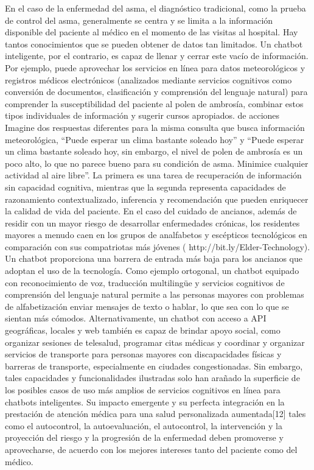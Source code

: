 En el caso de la enfermedad del asma, el diagnóstico tradicional, como la prueba de control del asma, generalmente se centra y se limita a la información disponible del paciente al médico en el momento de las visitas al hospital. Hay tantos conocimientos que se pueden obtener de datos tan limitados. Un chatbot inteligente, por el contrario, es capaz de llenar y cerrar este vacío de información. Por ejemplo, puede aprovechar los servicios en línea para datos meteorológicos y registros médicos electrónicos (analizados mediante servicios cognitivos como conversión de documentos, clasificación y comprensión del lenguaje natural) para comprender la susceptibilidad del paciente al polen de ambrosía, combinar estos tipos individuales de información y sugerir cursos apropiados. de acciones Imagine dos respuestas diferentes para la misma consulta que busca información meteorológica, “Puede esperar un clima bastante soleado hoy” y “Puede esperar un clima bastante soleado hoy, sin embargo, el nivel de polen de ambrosía es un poco alto, lo que no parece bueno para su condición de asma. Minimice cualquier actividad al aire libre”. La primera es una tarea de recuperación de información sin capacidad cognitiva, mientras que la segunda representa capacidades de razonamiento contextualizado, inferencia y recomendación que pueden enriquecer la calidad de vida del paciente.
En el caso del cuidado de ancianos, además de residir con un mayor riesgo de desarrollar enfermedades crónicas, los residentes mayores a menudo caen en los grupos de analfabetos y escépticos tecnológicos en comparación con sus compatriotas más jóvenes ( http://bit.ly/Elder-Technology). Un chatbot proporciona una barrera de entrada más baja para los ancianos que adoptan el uso de la tecnología. Como ejemplo ortogonal, un chatbot equipado con reconocimiento de voz, traducción multilingüe y servicios cognitivos de comprensión del lenguaje natural permite a las personas mayores con problemas de alfabetización enviar mensajes de texto o hablar, lo que sea con lo que se sientan más cómodos. Alternativamente, un chatbot con acceso a API geográficas, locales y web también es capaz de brindar apoyo social, como organizar sesiones de telesalud, programar citas médicas y coordinar y organizar servicios de transporte para personas mayores con discapacidades físicas y barreras de transporte, especialmente en ciudades congestionadas. Sin embargo, tales capacidades y funcionalidades ilustradas solo han arañado la superficie de los posibles casos de uso más amplios de servicios cognitivos en línea para chatbots inteligentes. Su impacto emergente y su perfecta integración en la prestación de atención médica para una salud personalizada aumentada[12] tales como el autocontrol, la autoevaluación, el autocontrol, la intervención y la proyección del riesgo y la progresión de la enfermedad deben promoverse y aprovecharse, de acuerdo con los mejores intereses tanto del paciente como del médico.
